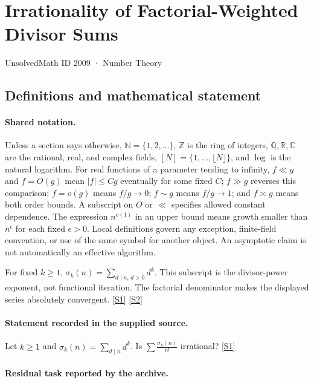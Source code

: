 \documentclass[11pt,a4paper]{article}
\newcommand{\N}{\mathbb{N}}
\newcommand{\Z}{\mathbb{Z}}
\newcommand{\Q}{\mathbb{Q}}
\newcommand{\R}{\mathbb{R}}
\newcommand{\C}{\mathbb{C}}
\newcommand{\sref}[2]{\hyperlink{source:#1:#2}{[S#2]}}
\begin{document}

\setcounter{section}{2008}

\section{Irrationality of Factorial-Weighted Divisor Sums}\label{2009}

{\small\sffamily UnsolvedMath ID 2009 · Number Theory}

\subsection{Definitions and mathematical statement}

\paragraph{Shared notation.}Unless a section says otherwise, $\N=\{1,2,\ldots\}$,
$\Z$ is the ring of integers, $\Q,\R,\C$ are the rational, real, and complex
fields, $[N]=\{1,\ldots,\lfloor N\rfloor\}$, and $\log$ is the natural
logarithm. For real functions of a parameter tending to infinity,
$f\ll g$ and $f=O(g)$ mean $|f|\leq Cg$ eventually for some fixed $C$;
$f\gg g$ reverses this comparison; $f=o(g)$ means $f/g\to0$;
$f\sim g$ means $f/g\to1$; and $f\asymp g$ means both order bounds.
A subscript on $O$ or $\ll$ specifies allowed constant dependence.
The expression $n^{o(1)}$ in an upper bound means growth smaller than
$n^\epsilon$ for each fixed $\epsilon>0$. Local definitions govern any
exception, finite-field convention, or use of the same symbol for another
object. An asymptotic claim is not automatically an effective algorithm.



For fixed $k\geq1$, $\sigma_k(n)=\sum_{d\mid n,\,d>0}d^k$. This subscript is the divisor-power exponent, not functional iteration. The factorial denominator makes the displayed series absolutely convergent. \sref{2009}{1} \sref{2009}{2}

\paragraph{Statement recorded in the supplied source.}
Let $k\geq 1$ and $\sigma_k(n)=\sum_{d\mid n}d^k$. Is $ \sum \frac{\sigma_k(n)}{n!} $ irrational? \sref{2009}{1}

\paragraph{Residual task reported by the archive.}
\end{document}
